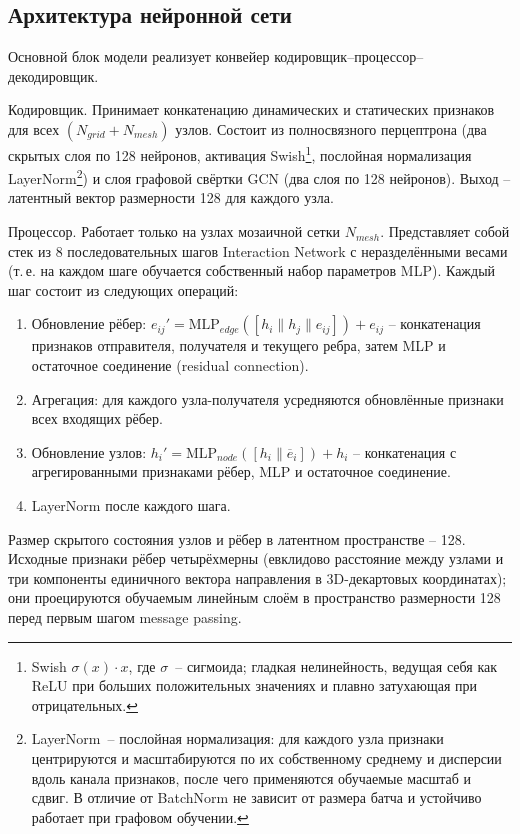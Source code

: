 \documentclass[14pt,a4paper]{extarticle}
\numberwithin{table}{section}
\numberwithin{figure}{section}
\numberwithin{equation}{section}
\begin{document}
\subsection{Архитектура нейронной сети}\label{ux430ux440ux445ux438ux442ux435ux43aux442ux443ux440ux430-ux43dux435ux439ux440ux43eux43dux43dux43eux439-ux441ux435ux442ux438}

Основной блок модели реализует конвейер кодировщик--процессор--декодировщик.

Кодировщик. Принимает конкатенацию динамических и
статических признаков для всех \((N_{grid} + N_{mesh})\) узлов. Состоит
из полносвязного перцептрона (два скрытых слоя по 128 нейронов,
активация Swish\footnote{Swish $\sigma(x)\cdot x$, где $\sigma$~--
сигмоида; гладкая нелинейность, ведущая себя как ReLU при больших
положительных значениях и плавно затухающая при отрицательных.},
послойная нормализация LayerNorm\footnote{LayerNorm~-- послойная
нормализация: для каждого узла признаки центрируются и масштабируются
по их собственному среднему и дисперсии вдоль канала признаков, после
чего применяются обучаемые масштаб и сдвиг. В отличие от BatchNorm не
зависит от размера батча и устойчиво работает при графовом обучении.})
и слоя графовой свёртки GCN (два слоя по 128 нейронов). Выход --
латентный вектор размерности 128 для каждого узла.

Процессор. Работает только на узлах мозаичной сетки
\(N_{mesh}\). Представляет собой стек из 8 последовательных шагов
Interaction Network с неразделёнными весами (т.\,е. на каждом шаге
обучается собственный набор параметров MLP). Каждый шаг состоит из
следующих операций:
\begin{enumerate}
\def\labelenumi{\arabic{enumi}.}
\item Обновление рёбер:
\(e_{ij}' = \text{MLP}_{edge}([h_i \| h_j \| e_{ij}]) + e_{ij}\) --
конкатенация признаков отправителя, получателя и текущего ребра, затем
MLP и остаточное соединение (residual connection).
\item Агрегация: для каждого узла-получателя усредняются
обновлённые признаки всех входящих рёбер.
\item Обновление узлов:
\(h_i' = \text{MLP}_{node}([h_i \| \overline{e}_i]) + h_i\) --
конкатенация с агрегированными признаками рёбер, MLP и остаточное
соединение.
\item LayerNorm после каждого шага.
\end{enumerate}
Размер скрытого состояния узлов и рёбер в латентном пространстве --
128. Исходные признаки рёбер четырёхмерны (евклидово расстояние
между узлами и три компоненты единичного вектора направления в
3D-декартовых координатах); они проецируются обучаемым линейным слоём
в пространство размерности 128 перед первым шагом message passing.
\end{document}
